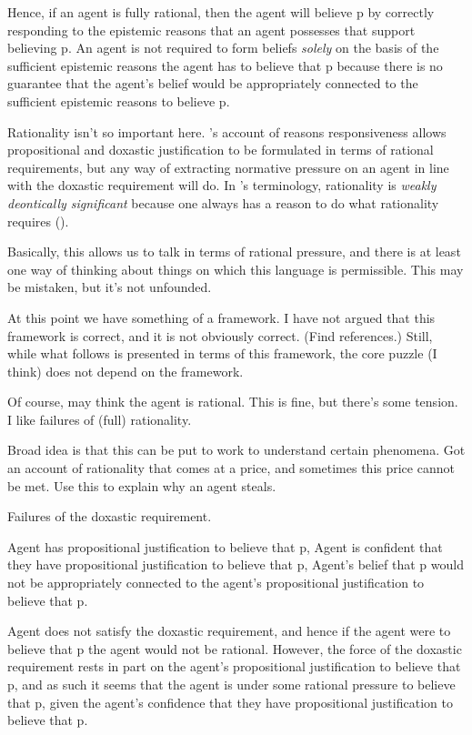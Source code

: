\documentclass[10pt]{article}
\begin{document}
Hence, if an agent is fully rational, then the agent will believe p by correctly responding to the epistemic reasons that an agent possesses that support believing p.
An agent is not required to form beliefs \emph{solely} on the basis of the sufficient epistemic reasons the agent has to believe that p because there is no guarantee that the agent's belief would be appropriately connected to the sufficient epistemic reasons to believe p.

Rationality isn't so important here.
\citeauthor{Lord:2017aa}'s account of reasons responsiveness allows propositional and doxastic justification to be formulated in terms of rational requirements, but any way of extracting normative pressure on an agent in line with the doxastic requirement will do.
In \citeauthor{Lord:2017aa}'s terminology, rationality is \emph{weakly deontically significant} because one always has a reason to do what rationality requires (\citeyear[1114, 1133]{Lord:2017aa}).

\begin{note}
  Basically, this allows us to talk in terms of rational pressure, and there is at least one way of thinking about things on which this language is permissible.
  This may be mistaken, but it's not unfounded.

  At this point we have something of a framework.
  I have not argued that this framework is correct, and it is not obviously correct.
  (Find references.)
  Still, while what follows is presented in terms of this framework, the core puzzle (I think) does not depend on the framework.

  Of course, may think the agent is rational.
  This is fine, but there's some tension.
  I like failures of (full) rationality.

  Broad idea is that this can be put to work to understand certain phenomena.
  Got an account of rationality that comes at a price, and sometimes this price cannot be met.
  Use this to explain why an agent steals.
\end{note}

Failures of the doxastic requirement.

Agent has propositional justification to believe that p,
Agent is confident that they have propositional justification to believe that p,
Agent's belief that p would not be appropriately connected to the agent's propositional justification to believe that p.

Agent does not satisfy the doxastic requirement, and hence if the agent were to believe that p the agent would not be rational.
However, the force of the doxastic requirement rests in part on the agent's propositional justification to believe that p, and as such it seems that the agent is under some rational pressure to believe that p, given the agent's confidence that they have propositional justification to believe that p.
\end{document}
